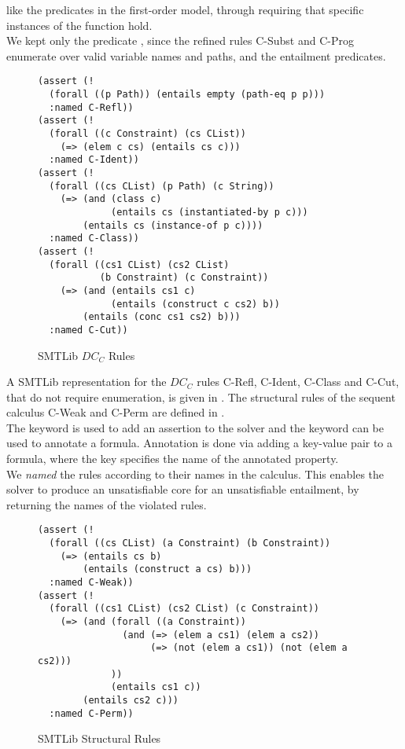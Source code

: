 like the predicates in the first-order model,
through requiring that specific instances of the function hold.
\\
We kept only the predicate , since the refined rules
C-Subst and C-Prog enumerate over valid variable names and paths,
and the entailment predicates. %
\\
%
\begin{figure}[t]
\begin{lstlisting}[language=smtlib]
(assert (!
  (forall ((p Path)) (entails empty (path-eq p p)))
  :named C-Refl))
(assert (!
  (forall ((c Constraint) (cs CList))
    (=> (elem c cs) (entails cs c)))
  :named C-Ident))
(assert (!
  (forall ((cs CList) (p Path) (c String))
    (=> (and (class c)
             (entails cs (instantiated-by p c)))
        (entails cs (instance-of p c))))
  :named C-Class))
(assert (!
  (forall ((cs1 CList) (cs2 CList)
           (b Constraint) (c Constraint))
    (=> (and (entails cs1 c)
             (entails (construct c cs2) b))
        (entails (conc cs1 cs2) b)))
  :named C-Cut))
\end{lstlisting}
\caption{SMTLib $DC_C$ Rules}
\label{fig:smtlib-basic-rules}
\end{figure}
A SMTLib representation for the $DC_C$ rules C-Refl,
C-Ident, C-Class and \mbox{C-Cut}, that do not
require enumeration, is given in .
The structural rules of the sequent calculus C-Weak and C-Perm
are defined in .\\
The keyword  is used to add an assertion
to the solver and the keyword \smtlib{!} can be used to
annotate a formula.
Annotation is done via adding a key-value pair to a formula,
where the key specifies the name of the annotated property.\\
We \textit{named} the rules according to their names in the calculus.
This enables the solver to produce an unsatisfiable core
for an unsatisfiable entailment,
by returning the names of the violated rules.
%
\begin{figure}[h]
\begin{lstlisting}[language=smtlib]
(assert (!
  (forall ((cs CList) (a Constraint) (b Constraint))
    (=> (entails cs b)
        (entails (construct a cs) b)))
  :named C-Weak))
(assert (!
  (forall ((cs1 CList) (cs2 CList) (c Constraint))
    (=> (and (forall ((a Constraint))
               (and (=> (elem a cs1) (elem a cs2))
                    (=> (not (elem a cs1)) (not (elem a cs2)))
             ))
             (entails cs1 c))
        (entails cs2 c)))
  :named C-Perm))
\end{lstlisting}
\caption{SMTLib Structural Rules}
\label{fig:smtlib-structural-rules}
\end{figure}\\
